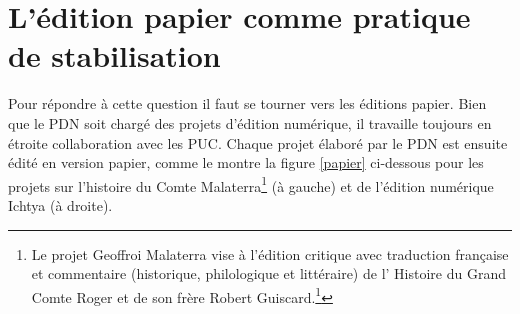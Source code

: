 \documentclass[a4paper,12pt,twoside]{book}
\begin{document}
\section{L'édition papier comme pratique de stabilisation}

Pour répondre à cette question il faut se tourner vers les éditions papier. Bien que le \acrshort{PDN} soit chargé des projets d'édition numérique, il travaille toujours en étroite collaboration avec les \acrshort{PUC}. Chaque projet élaboré par le \acrshort{PDN} est ensuite édité en version papier, comme le montre la figure \ref{papier} ci-dessous pour les projets sur l'histoire du Comte Malaterra\footnote{Le projet Geoffroi  Malaterra vise à l'édition critique avec traduction française et commentaire (historique, philologique et littéraire) de l' Histoire du Grand Comte Roger et de son frère Robert Guiscard.\footcite{Malaterra}} (à gauche) et de l'édition numérique Ichtya (à droite).
\end{document}
